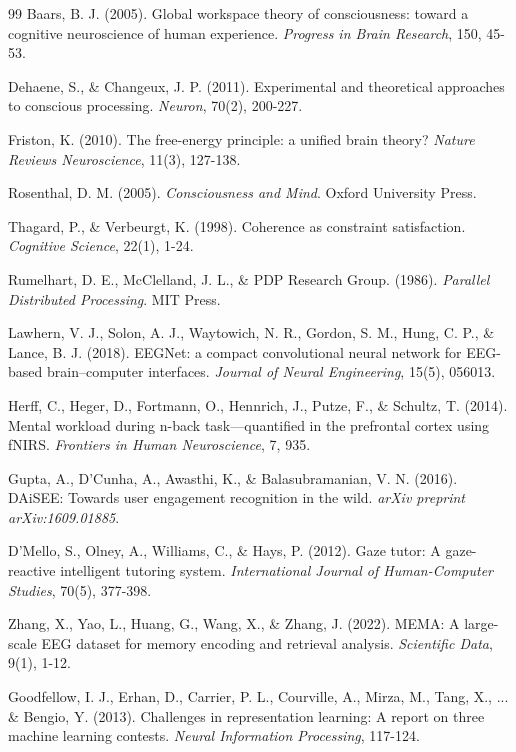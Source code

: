 \documentclass[10pt,journal,compsoc]{IEEEtran}
\begin{document}
\begin{thebibliography}{99}
Baars, B. J. (2005). Global workspace theory of consciousness: toward a cognitive neuroscience of human experience. \textit{Progress in Brain Research}, 150, 45-53.

Dehaene, S., \& Changeux, J. P. (2011). Experimental and theoretical approaches to conscious processing. \textit{Neuron}, 70(2), 200-227.

Friston, K. (2010). The free-energy principle: a unified brain theory? \textit{Nature Reviews Neuroscience}, 11(3), 127-138.

Rosenthal, D. M. (2005). \textit{Consciousness and Mind}. Oxford University Press.

Thagard, P., \& Verbeurgt, K. (1998). Coherence as constraint satisfaction. \textit{Cognitive Science}, 22(1), 1-24.

Rumelhart, D. E., McClelland, J. L., \& PDP Research Group. (1986). \textit{Parallel Distributed Processing}. MIT Press.

Lawhern, V. J., Solon, A. J., Waytowich, N. R., Gordon, S. M., Hung, C. P., \& Lance, B. J. (2018). EEGNet: a compact convolutional neural network for EEG-based brain–computer interfaces. \textit{Journal of Neural Engineering}, 15(5), 056013.

Herff, C., Heger, D., Fortmann, O., Hennrich, J., Putze, F., \& Schultz, T. (2014). Mental workload during n-back task—quantified in the prefrontal cortex using fNIRS. \textit{Frontiers in Human Neuroscience}, 7, 935.

Gupta, A., D'Cunha, A., Awasthi, K., \& Balasubramanian, V. N. (2016). DAiSEE: Towards user engagement recognition in the wild. \textit{arXiv preprint arXiv:1609.01885}.

D'Mello, S., Olney, A., Williams, C., \& Hays, P. (2012). Gaze tutor: A gaze-reactive intelligent tutoring system. \textit{International Journal of Human-Computer Studies}, 70(5), 377-398.

Zhang, X., Yao, L., Huang, G., Wang, X., \& Zhang, J. (2022). MEMA: A large-scale EEG dataset for memory encoding and retrieval analysis. \textit{Scientific Data}, 9(1), 1-12.

Goodfellow, I. J., Erhan, D., Carrier, P. L., Courville, A., Mirza, M., Tang, X., ... \& Bengio, Y. (2013). Challenges in representation learning: A report on three machine learning contests. \textit{Neural Information Processing}, 117-124.


\end{thebibliography}
\end{document}
